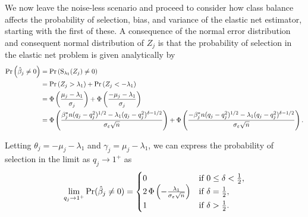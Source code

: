 We now leave the noise-less scenario and proceed to consider how class balance affects the
probability of selection, bias, and variance of the elastic net estimator, starting with
the first of these. A consequence of the normal error distribution and consequent normal
distribution of \({Z_j}\) is that the probability of selection in the elastic net problem
is given analytically by
\begin{align}
  \label{eq:selection-probability}
  \Pr\left(\hat{\beta}_j \neq 0\right) & = \Pr\left(\operatorname{S}_{\lambda_1}({Z_j}) \neq 0\right)                                                                                                                                                                                                                           \nonumber \\
                                       & = \Pr\left({Z_j} > \lambda_1\right) + \Pr\left({Z_j} < -\lambda_1\right)                                                                                                                                                                                                  \nonumber \\
                                       & = \operatorname{\Phi}\left(\frac{\mu_j - \lambda_1}{\sigma_j}\right) + \operatorname{\Phi}\left(\frac{- \mu_j -\lambda_1}{\sigma_j}\right)                                                                                                                                                              \nonumber \\
                                       & = \operatorname{\Phi} \left( \frac{\beta_j^*n (q_j-q_j^2)^{1/2} - \lambda_1(q_j-q_j^2)^{\delta - 1/2}}{\sigma_\varepsilon \sqrt{n}}\right)                 + \operatorname{\Phi} \left( \frac{-\beta_j^*n (q_j-q_j^2)^{1/2} - \lambda_1(q_j-q_j^2)^{\delta - 1/2}}{\sigma_\varepsilon \sqrt{n}}\right).
\end{align}

Letting \(\theta_j = -\mu_j - \lambda_1 \) and \(\gamma_j = \mu_j - \lambda_1\), we can
express the probability of selection in the limit as \(q_j \rightarrow 1^+\) as
\begin{equation}
  \label{eq:selection-probability-limit}
  \lim_{q_j \rightarrow 1^+} \Pr(\hat{\beta}_j \neq 0) =
  \begin{cases}
    0                                                                & \text{if } 0 \leq \delta < \frac{1}{2}, \\
    2\operatorname{\Phi}\left(-\frac{\lambda_1}{\sigma_\varepsilon \sqrt{n}}\right) & \text{if } \delta = \frac{1}{2},        \\
    1                                                                & \text{if } \delta > \frac{1}{2}.
  \end{cases}
\end{equation}


